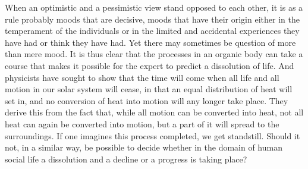 \documentclass[12pt,a4paper,openany]{book}
\begin{document}
When an optimistic and a pessimistic view stand
opposed to each other, it is as a rule probably moods that are
decisive, moods that have their
origin either in the temperament of the individuals or in the limited
and accidental experiences they have had or think they have
had. Yet there may sometimes be question of more
than mere mood. It is thus clear that the processes in
an organic body can take a course that makes it
possible for the expert to predict a dissolution of life.
And physicists have sought to show that the time will come when
all life and all motion in our solar system will cease, in that
an equal distribution of heat will set in, and no
conversion of heat into motion will any longer take place.
They derive this from the fact that, while all motion can be converted
into heat, not all heat can again be converted into motion,
but a part of it will spread to the surroundings. If
one imagines this process completed, we get standstill. Should it
not, in a similar way, be possible to decide whether
in the domain of human social life a
dissolution and a decline or a progress is taking place?
\end{document}
